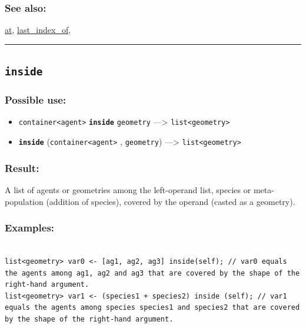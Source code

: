 \documentclass[]{book}
\providecommand{\tightlist}{%
  \setlength{\itemsep}{0pt}\setlength{\parskip}{0pt}}
\theoremstyle{definition}
\theoremstyle{definition}
\theoremstyle{definition}
\theoremstyle{remark}
\begin{document}
\subsubsection{See also:}\label{see-also-117}

\href{operators-a-to-a.html\#at}{at},
\href{operators-i-to-m.html\#last_index_of}{last\_index\_of},

\begin{center}\rule{0.5\linewidth}{\linethickness}\end{center}

\subsection{\texorpdfstring{\texttt{inside}}{inside}}\label{inside}

\subsubsection{Possible use:}\label{possible-use-275}

\begin{itemize}
\tightlist
\item
  \texttt{container\textless{}agent\textgreater{}}
  \textbf{\texttt{inside}} \texttt{geometry} ---\textgreater{}
  \texttt{list\textless{}geometry\textgreater{}}
\item
  \textbf{\texttt{inside}}
  (\texttt{container\textless{}agent\textgreater{}} , \texttt{geometry})
  ---\textgreater{} \texttt{list\textless{}geometry\textgreater{}}
\end{itemize}

\subsubsection{Result:}\label{result-265}

A list of agents or geometries among the left-operand list, species or
meta-population (addition of species), covered by the operand (casted as
a geometry).

\subsubsection{Examples:}\label{examples-209}

\begin{verbatim}
 
list<geometry> var0 <- [ag1, ag2, ag3] inside(self); // var0 equals the agents among ag1, ag2 and ag3 that are covered by the shape of the right-hand argument. 
list<geometry> var1 <- (species1 + species2) inside (self); // var1 equals the agents among species species1 and species2 that are covered by the shape of the right-hand argument.
\end{verbatim}
\end{document}
